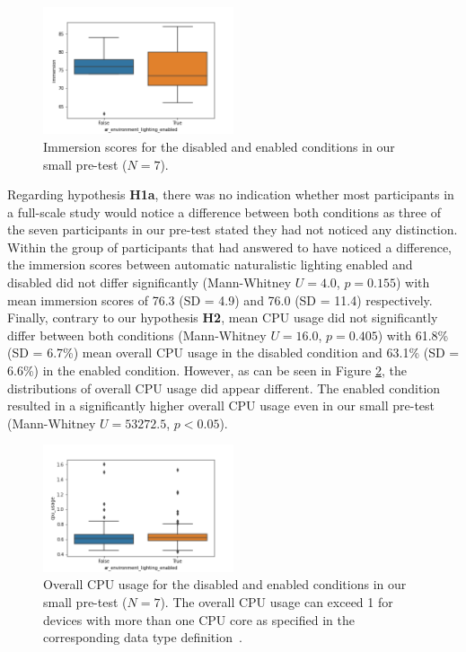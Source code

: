\documentclass[12pt,twoside,english]{article}
\begin{document}
\begin{figure}[h]
    \centering
    \includegraphics[width=0.5\textwidth]{imgs/immersion_plot}
    \caption{Immersion scores for the disabled and enabled conditions in our small pre-test ($ N = 7 $).}
    \label{fig:immersion_plot}
\end{figure}

Regarding hypothesis \textbf{H1a}, there was no indication whether most participants in a full-scale study would notice a difference between both conditions as three of the seven participants in our pre-test stated they had not noticed any distinction.
Within the group of participants that had answered to have noticed a difference, the immersion scores between automatic naturalistic lighting enabled and disabled did not differ significantly (Mann-Whitney $ U = 4.0 $, $ p = 0.155 $) with mean immersion scores of 76.3 (SD = 4.9) and 76.0 (SD = 11.4) respectively.
Finally, contrary to our hypothesis \textbf{H2}, mean \gls{CPU} usage did not significantly differ between both conditions (Mann-Whitney $ U = 16.0 $, $ p = 0.405 $) with 61.8\% (SD = 6.7\%) mean overall \gls{CPU} usage in the disabled condition and 63.1\% (SD = 6.6\%) in the enabled condition.
However, as can be seen in Figure \ref{fig:cpu_raw_plot}, the distributions of overall \gls{CPU} usage did appear different.
The enabled condition resulted in a significantly higher overall \gls{CPU} usage even in our small pre-test (Mann-Whitney $ U = 53272.5 $, $ p < 0.05 $).

\begin{figure}[h]
    \centering
    \includegraphics[width=0.5\textwidth]{imgs/cpu_raw_plot}
    \caption{Overall \gls{CPU} usage for the disabled and enabled conditions in our small pre-test ($ N = 7 $). The overall \gls{CPU} usage can exceed 1 for devices with more than one \gls{CPU} core as specified in the corresponding data type definition~\cite{apple_system_2020}.}
    \label{fig:cpu_raw_plot}
\end{figure}
\end{document}
